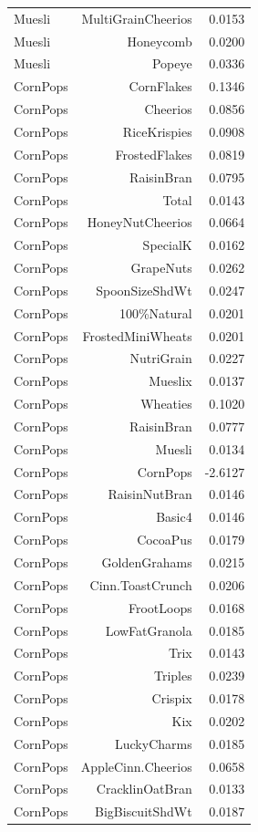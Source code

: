 \begin{longtable}{@{}lrr@{}}
Muesli & MultiGrainCheerios & 0.0153 \\
Muesli & Honeycomb & 0.0200 \\
Muesli & Popeye & 0.0336 \\
CornPops & CornFlakes & 0.1346 \\
CornPops & Cheerios & 0.0856 \\
CornPops & RiceKrispies & 0.0908 \\
CornPops & FrostedFlakes & 0.0819 \\
CornPops & RaisinBran & 0.0795 \\
CornPops & Total & 0.0143 \\
CornPops & HoneyNutCheerios & 0.0664 \\
CornPops & SpecialK & 0.0162 \\
CornPops & GrapeNuts & 0.0262 \\
CornPops & SpoonSizeShdWt & 0.0247 \\
CornPops & 100\%Natural & 0.0201 \\
CornPops & FrostedMiniWheats & 0.0201 \\
CornPops & NutriGrain & 0.0227 \\
CornPops & Mueslix & 0.0137 \\
CornPops & Wheaties & 0.1020 \\
CornPops & RaisinBran & 0.0777 \\
CornPops & Muesli & 0.0134 \\
CornPops & CornPops & -2.6127 \\
CornPops & RaisinNutBran & 0.0146 \\
CornPops & Basic4 & 0.0146 \\
CornPops & CocoaPus & 0.0179 \\
CornPops & GoldenGrahams & 0.0215 \\
CornPops & Cinn.ToastCrunch & 0.0206 \\
CornPops & FrootLoops & 0.0168 \\
CornPops & LowFatGranola & 0.0185 \\
CornPops & Trix & 0.0143 \\
CornPops & Triples & 0.0239 \\
CornPops & Crispix & 0.0178 \\
CornPops & Kix & 0.0202 \\
CornPops & LuckyCharms & 0.0185 \\
CornPops & AppleCinn.Cheerios & 0.0658 \\
CornPops & CracklinOatBran & 0.0133 \\
CornPops & BigBiscuitShdWt & 0.0187 \\

\end{longtable}
